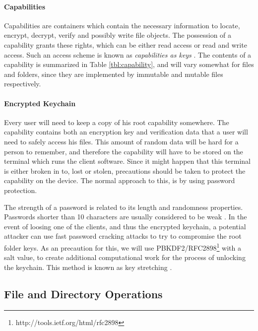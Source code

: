 \documentclass[pdftex,english,10pt,b5paper,twoside]{book}
\begin{document}
\paragraph{Capabilities} Capabilities are containers which contain the
necessary information to locate, encrypt, decrypt, verify and possibly write
file objects. The possession of a capability grants these rights, which can be
either read access or read and write access. Such an access scheme is known as
\emph{capabilities as keys} \cite{capabilitymyths}. The contents of a
capability is summarized in Table \ref{tbl:capability}, and will vary somewhat
for files and folders, since they are implemented by immutable and mutable
files respectively.



\paragraph{Encrypted Keychain} Every user will need to keep a copy of his root
capability somewhere. The capability contains both an encryption key and
verification data that a user will need to safely access his files.
This amount of random data will be hard for a person to remember, and therefore
the capability will have to be stored on the terminal which runs the client
software. Since it might happen that this terminal is either broken in to,
lost or stolen, precautions should be taken to protect the capability on the
device. The normal approach to this, is by using password protection.

The strength of a password is related to its length and randomness properties.
Passwords shorter than 10 characters are usually considered to be weak
\cite{pbkdf_nist}. In the event of loosing one of the clients, and thus the
encrypted keychain, a potential attacker can use fast password cracking attacks
to try to compromise the root folder keys. As an precaution for this, we will
use \ac{PBKDF2}/RFC2898\footnote{http://tools.ietf.org/html/rfc2898} with a
salt value, to create additional computational work for the process of
unlocking the keychain. This method is known as key stretching
\cite{keystretch}. %

\subsection{File and Directory Operations}
\label{sec:CS:DO}
\end{document}
